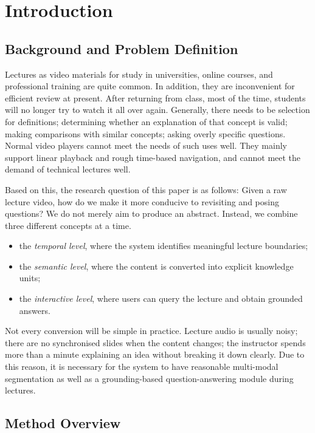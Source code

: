 \section{Introduction}

\subsection{Background and Problem Definition}

Lectures as video materials for study in universities, online courses, and professional training are quite common. In addition, they are inconvenient for efficient review at present. After returning from class, most of the time, students will no longer try to watch it all over again. Generally, there needs to be selection for definitions; determining whether an explanation of that concept is valid; making comparisons with similar concepts; asking overly specific questions. Normal video players cannot meet the needs of such uses well. They mainly support linear playback and rough time-based navigation, and cannot meet the demand of technical lectures well.

Based on this, the research question of this paper is as follows: Given a raw lecture video, how do we make it more conducive to revisiting and posing questions? We do not merely aim to produce an abstract. Instead, we combine three different concepts at a time.

\begin{itemize}
\item the \textit{temporal level}, where the system identifies meaningful lecture boundaries;
\item the \textit{semantic level}, where the content is converted into explicit knowledge units;
\item the \textit{interactive level}, where users can query the lecture and obtain grounded answers.
\end{itemize}

Not every conversion will be simple in practice. Lecture audio is usually noisy; there are no synchronised slides when the content changes; the instructor spends more than a minute explaining an idea without breaking it down clearly. Due to this reason, it is necessary for the system to have reasonable multi-modal segmentation as well as a grounding-based question-answering module during lectures.

\subsection{Method Overview}

